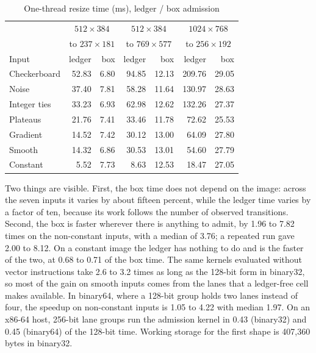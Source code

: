 \documentclass[journal]{IEEEtran}
\begin{document}
\begin{table}[H]
\caption{One-thread resize time (ms), ledger / box admission}
\label{tab:boxcost}
\centering
\scriptsize
\setlength{\tabcolsep}{3.2pt}
\begin{tabular}{l|rr|rr|rr}
\hline
 & \multicolumn{2}{c|}{$512{\times}384$}
 & \multicolumn{2}{c|}{$512{\times}384$}
 & \multicolumn{2}{c}{$1024{\times}768$}\\
 & \multicolumn{2}{c|}{to $237{\times}181$}
 & \multicolumn{2}{c|}{to $769{\times}577$}
 & \multicolumn{2}{c}{to $256{\times}192$}\\
Input & ledger & box & ledger & box & ledger & box\\
\hline
Checkerboard & 52.83 & 6.80 & 94.85 & 12.13 & 209.76 & 29.05\\
Noise        & 37.40 & 7.81 & 58.28 & 11.64 & 130.97 & 28.63\\
Integer ties & 33.23 & 6.93 & 62.98 & 12.62 & 132.26 & 27.37\\
Plateaus     & 21.76 & 7.41 & 33.46 & 11.78 &  72.62 & 25.53\\
Gradient     & 14.52 & 7.42 & 30.12 & 13.00 &  64.09 & 27.80\\
Smooth       & 14.32 & 6.86 & 30.53 & 13.01 &  54.60 & 27.79\\
Constant     &  5.52 & 7.73 &  8.63 & 12.53 &  18.47 & 27.05\\
\hline
\end{tabular}
\end{table}

Two things are visible. First, the box time does not depend on the
image: across the seven inputs it varies by about fifteen percent,
while the ledger time varies by a factor of ten, because its work
follows the number of observed transitions. Second, the box is faster
wherever there is anything to admit, by 1.96 to 7.82 times on the
non-constant inputs, with a median of 3.76; a repeated run gave 2.00 to
8.12. On a constant image the ledger has nothing to do and is the
faster of the two, at 0.68 to 0.71 of the box time. The same kernels
evaluated without vector instructions take 2.6 to 3.2 times as long as
the 128-bit form in binary32, so most of the gain on smooth inputs
comes from the lanes that a ledger-free cell makes available. In
binary64, where a 128-bit group holds two lanes instead of four, the
speedup on non-constant inputs is 1.05 to 4.22 with median 1.97. On an
x86-64 host, 256-bit lane groups run the admission kernel in 0.43
(binary32) and 0.45 (binary64) of the 128-bit time. Working storage for
the first shape is 407{,}360 bytes in binary32.
\end{document}
